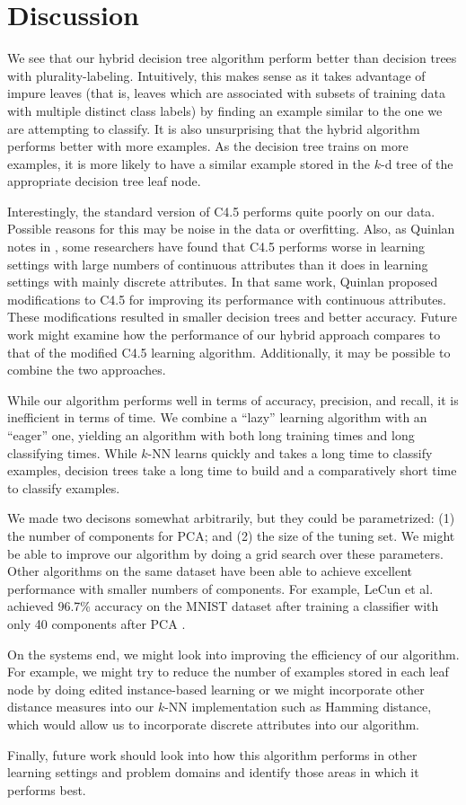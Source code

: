 \section{Discussion}

We see that our hybrid decision tree algorithm perform better than decision trees with plurality-labeling. Intuitively, this makes sense as it takes advantage of impure leaves (that is, leaves which are associated with subsets of training data with multiple distinct class labels) by finding an example similar to the one we are attempting to classify. It is also unsurprising that the hybrid algorithm performs better with more examples. As the decision tree trains on more examples, it is more likely to have a similar example stored in the $k$-d tree of the appropriate decision tree leaf node.

Interestingly, the standard version of C4.5 performs quite poorly on our data. Possible reasons for this may be noise in the data or overfitting. Also, as Quinlan notes in \cite{quinlan1996improved}, some researchers have found that C4.5 performs worse in learning settings with large numbers of continuous attributes than it does in learning settings with mainly discrete attributes. In that same work, Quinlan proposed modifications to C4.5 for improving its performance with continuous attributes. These modifications resulted in smaller decision trees and better accuracy. Future work might examine how the performance of our hybrid approach compares to that of the modified C4.5 learning algorithm.  Additionally, it may be possible to combine the two approaches.

While our algorithm performs well in terms of accuracy, precision, and recall, it is inefficient in terms of time. We combine a ``lazy'' learning algorithm with an ``eager'' one, yielding an algorithm with both long training times and long classifying times. While $k$-NN learns quickly and takes a long time to classify examples, decision trees take a long time to build and a comparatively short time to classify examples.

We made two decisons somewhat arbitrarily, but they could be parametrized: (1) the number of components for PCA; and (2) the size of the tuning set. We might be able to improve our algorithm by doing a grid search over these parameters. Other algorithms on the same dataset have been able to achieve excellent performance with smaller numbers of components.  For example, LeCun et al. achieved 96.7\% accuracy on the MNIST dataset after training a classifier with only 40 components after PCA \cite{lecun1998gradient}.

On the systems end, we might look into improving the efficiency of our algorithm. For example, we might try to reduce the number of examples stored in each leaf node by doing edited instance-based learning or we might incorporate other distance measures into our $k$-NN implementation such as Hamming distance, which would allow us to incorporate discrete attributes into our algorithm.

Finally, future work should look into how this algorithm performs in other learning settings and problem domains and identify those areas in which it performs best.
